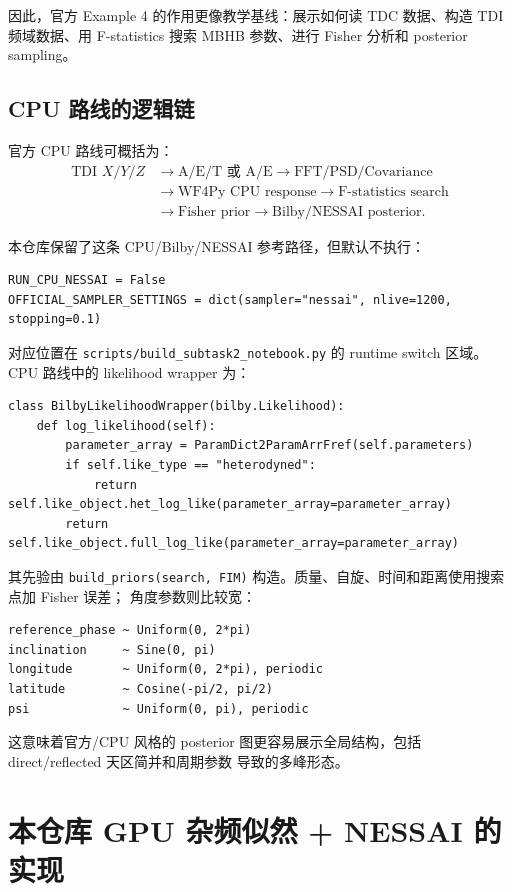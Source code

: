\documentclass[11pt,a4paper]{ctexart}
\newcommand{\scriptpath}{\texttt{scripts/build\_subtask2\_notebook.py}}
\begin{document}
因此，官方 Example 4 的作用更像教学基线：展示如何读 TDC 数据、构造 TDI 频域数据、用 F-statistics
搜索 MBHB 参数、进行 Fisher 分析和 posterior sampling。

\subsection{CPU 路线的逻辑链}

官方 CPU 路线可概括为：
\[
\begin{aligned}
\text{TDI }X/Y/Z
&\rightarrow \text{A/E/T 或 A/E}
\rightarrow \text{FFT/PSD/Covariance} \\
&\rightarrow \text{WF4Py CPU response}
\rightarrow \text{F-statistics search} \\
&\rightarrow \text{Fisher prior}
\rightarrow \text{Bilby/NESSAI posterior}.
\end{aligned}
\]

本仓库保留了这条 CPU/Bilby/NESSAI 参考路径，但默认不执行：
\begin{lstlisting}[style=pycode]
RUN_CPU_NESSAI = False
OFFICIAL_SAMPLER_SETTINGS = dict(sampler="nessai", nlive=1200, stopping=0.1)
\end{lstlisting}
对应位置在 \scriptpath{} 的 runtime switch 区域。CPU 路线中的 likelihood wrapper 为：
\begin{lstlisting}[style=pycode]
class BilbyLikelihoodWrapper(bilby.Likelihood):
    def log_likelihood(self):
        parameter_array = ParamDict2ParamArrFref(self.parameters)
        if self.like_type == "heterodyned":
            return self.like_object.het_log_like(parameter_array=parameter_array)
        return self.like_object.full_log_like(parameter_array=parameter_array)
\end{lstlisting}

其先验由 \texttt{build\_priors(search, FIM)} 构造。质量、自旋、时间和距离使用搜索点加 Fisher 误差；
角度参数则比较宽：
\begin{lstlisting}[style=pycode]
reference_phase ~ Uniform(0, 2*pi)
inclination     ~ Sine(0, pi)
longitude       ~ Uniform(0, 2*pi), periodic
latitude        ~ Cosine(-pi/2, pi/2)
psi             ~ Uniform(0, pi), periodic
\end{lstlisting}

这意味着官方/CPU 风格的 posterior 图更容易展示全局结构，包括 direct/reflected 天区简并和周期参数
导致的多峰形态。

\section{本仓库 GPU 杂频似然 + NESSAI 的实现}
\end{document}
